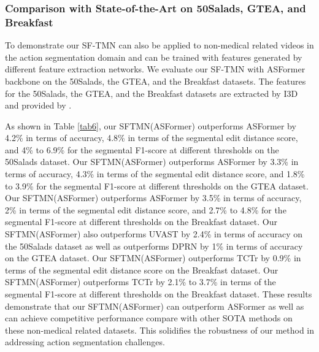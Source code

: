 \documentclass[sn-mathphys,Numbered]{sn-jnl}
\theoremstyle{thmstyleone}\newtheorem{theorem}{Theorem}\newtheorem{proposition}[theorem]{Proposition}
\theoremstyle{thmstyletwo}\newtheorem{example}{Example}\newtheorem{remark}{Remark}
\theoremstyle{thmstylethree}\newtheorem{definition}{Definition}
\begin{document}
\subsubsection{Comparison with State-of-the-Art on 50Salads, GTEA, and Breakfast}

To demonstrate our SF-TMN can also be applied to non-medical related videos in the action segmentation domain and can be trained with features generated by different feature extraction networks. We evaluate our SF-TMN with ASFormer backbone on the 50Salads, the GTEA, and the Breakfast datasets. The features for the 50Salads, the GTEA, and the Breakfast datasets are extracted by I3D and provided by \cite{farha2019ms}. 

As shown in Table \ref{tab6}, our SFTMN(ASFormer) outperforms ASFormer by 4.2\% in terms of accuracy, 4.8\% in terms of the segmental edit distance score, and 4\% to 6.9\% for the segmental F1-score at different thresholds on the 50Salads dataset. Our SFTMN(ASFormer) outperforms ASFormer by 3.3\% in terms of accuracy, 4.3\% in terms of the segmental edit distance score, and 1.8\% to 3.9\% for the segmental F1-score at different thresholds on the GTEA dataset. Our SFTMN(ASFormer) outperforms ASFormer by 3.5\% in terms of accuracy, 2\% in terms of the segmental edit distance score, and 2.7\% to 4.8\% for the segmental F1-score at different thresholds on the Breakfast dataset. Our SFTMN(ASFormer) also outperforms UVAST \cite{behrmann2022unified} by 2.4\% in terms of accuracy on the 50Salads dataset as well as outperforms DPRN \cite{park2022maximization} by 1\% in terms of accuracy on the GTEA dataset. Our SFTMN(ASFormer) outperforms TCTr \cite{aziere2022multistage} by 0.9\% in terms of the segmental edit distance score on the Breakfast dataset. Our SFTMN(ASFormer) outperforms TCTr \cite{aziere2022multistage} by 2.1\% to 3.7\% in terms of the segmental F1-score at different thresholds on the Breakfast dataset. These results demonstrate that our SFTMN(ASFormer) can outperform ASFormer as well as can achieve competitive performance compare with other SOTA methods on these non-medical related datasets. This solidifies the robustness of our method in addressing action segmentation challenges.
\end{document}
